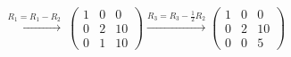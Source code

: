 \paragraph{$
        \begin{matrix}
            \overset{R_1 = R_1- R_2}{\longrightarrow} \
            \left(\begin{array}{cc|c}
                          1 & 0 & 0  \\
                          0 & 2 & 10 \\
                          0 & 1 & 10
                      \end{array}\right)
            \overset{R_3 = R_3 - \frac{1}{2}R_2}{\longrightarrow}
            \left(\begin{array}{cc|c}
                          1 & 0 & 0 \\
                          0 & 2 & 10  \\
                          0 & 0 & 5
                      \end{array}\right)
        \end{matrix}
    $}
% 
% 
% 
% 
% 
% 
% 
